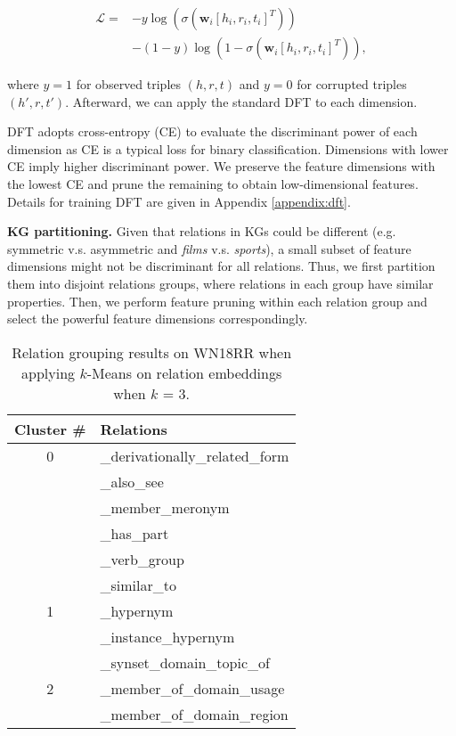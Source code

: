 \documentclass{article}
\begin{document}
\begin{equation}\label{equ:logistic}
\begin{split}
        \mathcal{L} = {} & -y \log(\sigma(\bm{w}_i[h_i, r_i, t_i]^T)) \\
                         & -(1 - y)
                    \log(1 - \sigma(\bm{w}_i[h_i, r_i, t_i]^T)), 
\end{split}
\end{equation}

where $y = 1$ for observed triples $(h, r, t)$ and $y = 0$ for corrupted triples $(h', r, t')$. 
Afterward, we can apply the standard DFT to each dimension.


DFT adopts cross-entropy (CE) to evaluate the discriminant power of each dimension as
CE is a typical loss for binary classification.  Dimensions
with lower CE imply higher discriminant power. We preserve the 
feature dimensions with the lowest CE and prune the remaining 
to obtain low-dimensional features. Details for training DFT
are given in Appendix \ref{appendix:dft}.




\textbf{KG partitioning.} Given that relations in KGs could be different 
(e.g. symmetric v.s. asymmetric and \emph{films} v.s. \emph{sports}), a small subset of feature dimensions
might not be discriminant for all relations. Thus, we first partition 
them into disjoint relations groups, where relations in each group 
have similar properties. Then, we perform feature pruning within each 
relation group and select the powerful feature dimensions correspondingly.

\begin{table}[t]
\centering
\begin{tabular}{ c l }
\toprule
Cluster \# & Relations \\
\midrule
0 & \_derivationally\_related\_form \\
  & \_also\_see \\
  & \_member\_meronym \\
  & \_has\_part \\
  & \_verb\_group \\
  & \_similar\_to \\
\midrule
1 & \_hypernym \\
  & \_instance\_hypernym \\
  & \_synset\_domain\_topic\_of \\
\midrule
2 & \_member\_of\_domain\_usage \\
  & \_member\_of\_domain\_region \\
\bottomrule
\end{tabular}
\caption{Relation grouping results on WN18RR when applying $k$-Means on 
relation embeddings when $k$ = 3.}
\label{tab:partition}
\end{table}
\end{document}
